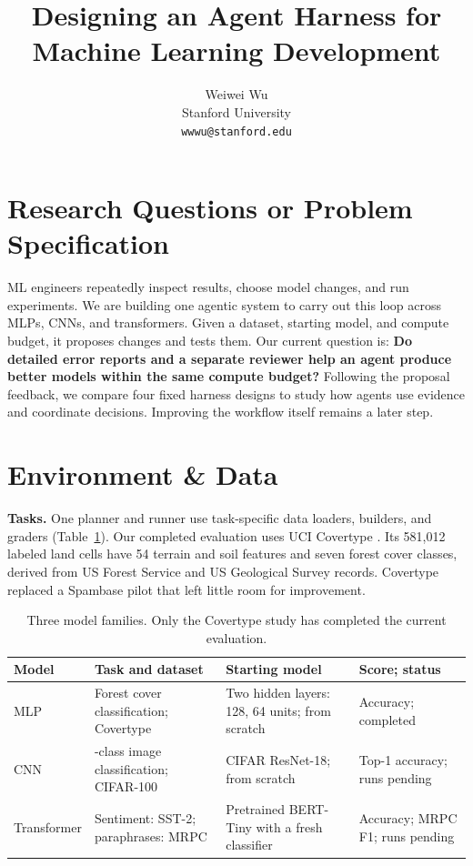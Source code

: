 \documentclass{article}
\title{Designing an Agent Harness for\\Machine Learning Development}
\author{Weiwei Wu\\Stanford University\\\texttt{wwwu@stanford.edu}}
\begin{document}
\maketitle
{}

\section{Research Questions or Problem Specification}
ML engineers repeatedly inspect results, choose model changes, and run experiments. We are building one agentic system to carry out this loop across MLPs, CNNs, and transformers. Given a dataset, starting model, and compute budget, it proposes changes and tests them. Our current question is: \textbf{Do detailed error reports and a separate reviewer help an agent produce better models within the same compute budget?} Following the proposal feedback, we compare four fixed harness designs to study how agents use evidence and coordinate decisions. Improving the workflow itself remains a later step.

\section{Environment \& Data}
\textbf{Tasks.} One planner and runner use task-specific data loaders, builders, and graders (Table~\ref{tab:tasks}). Our completed evaluation uses UCI Covertype \citep{blackard1998covertype}. Its 581,012 labeled land cells have 54 terrain and soil features and seven forest cover classes, derived from US Forest Service and US Geological Survey records. Covertype replaced a Spambase pilot that left little room for improvement.

\begin{table}[h]
\caption{Three model families. Only the Covertype study has completed the current evaluation.}
\label{tab:tasks}
\centering
\begin{tabularx}{\linewidth}{@{}>{\raggedright\arraybackslash}p{0.68in}>{\raggedright\arraybackslash}X >{\raggedright\arraybackslash}p{1.30in}>{\raggedright\arraybackslash}p{0.91in}@{}}
\toprule
\textbf{Model} & \textbf{Task and dataset} & \textbf{Starting model} & \textbf{Score; status}\\
\midrule
MLP & Forest cover classification; Covertype & Two hidden layers: 128, 64 units; from scratch & Accuracy; completed\\
CNN & 100-class image classification; CIFAR-100 & CIFAR ResNet-18; from scratch & Top-1 accuracy; runs pending\\
Transformer & Sentiment: SST-2; paraphrases: MRPC & Pretrained BERT-Tiny with a fresh classifier & Accuracy; MRPC F1; runs pending\\
\bottomrule
\end{tabularx}
\end{table}
\end{document}
